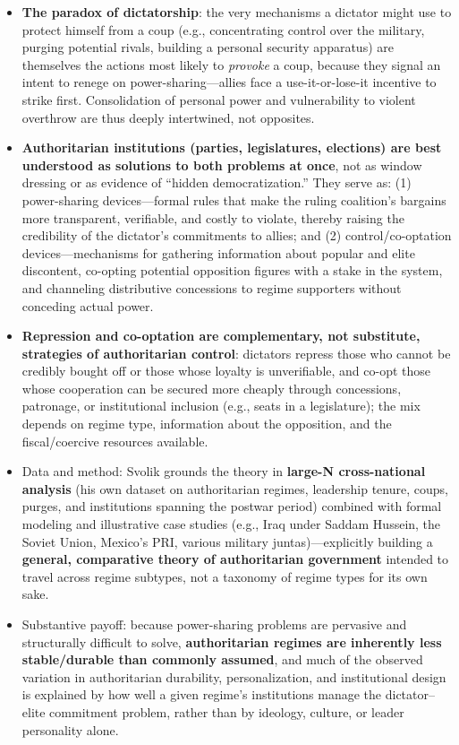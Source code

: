 \documentclass[12pt]{article}
\begin{document}
\begin{itemize}[leftmargin=*, itemsep=4pt]
    \item \textbf{The paradox of dictatorship}: the very mechanisms a dictator might use to protect himself from a coup (e.g., concentrating control over the military, purging potential rivals, building a personal security apparatus) are themselves the actions most likely to \emph{provoke} a coup, because they signal an intent to renege on power-sharing---allies face a use-it-or-lose-it incentive to strike first. Consolidation of personal power and vulnerability to violent overthrow are thus deeply intertwined, not opposites.
    \item \textbf{Authoritarian institutions (parties, legislatures, elections) are best understood as solutions to both problems at once}, not as window dressing or as evidence of ``hidden democratization.'' They serve as: (1) power-sharing devices---formal rules that make the ruling coalition's bargains more transparent, verifiable, and costly to violate, thereby raising the credibility of the dictator's commitments to allies; and (2) control/co-optation devices---mechanisms for gathering information about popular and elite discontent, co-opting potential opposition figures with a stake in the system, and channeling distributive concessions to regime supporters without conceding actual power.
    \item \textbf{Repression and co-optation are complementary, not substitute, strategies of authoritarian control}: dictators repress those who cannot be credibly bought off or those whose loyalty is unverifiable, and co-opt those whose cooperation can be secured more cheaply through concessions, patronage, or institutional inclusion (e.g., seats in a legislature); the mix depends on regime type, information about the opposition, and the fiscal/coercive resources available.
    \item Data and method: Svolik grounds the theory in \textbf{large-N cross-national analysis} (his own dataset on authoritarian regimes, leadership tenure, coups, purges, and institutions spanning the postwar period) combined with formal modeling and illustrative case studies (e.g., Iraq under Saddam Hussein, the Soviet Union, Mexico's PRI, various military juntas)---explicitly building a \textbf{general, comparative theory of authoritarian government} intended to travel across regime subtypes, not a taxonomy of regime types for its own sake.
    \item Substantive payoff: because power-sharing problems are pervasive and structurally difficult to solve, \textbf{authoritarian regimes are inherently less stable/durable than commonly assumed}, and much of the observed variation in authoritarian durability, personalization, and institutional design is explained by how well a given regime's institutions manage the dictator--elite commitment problem, rather than by ideology, culture, or leader personality alone.
\end{itemize}
\end{document}
